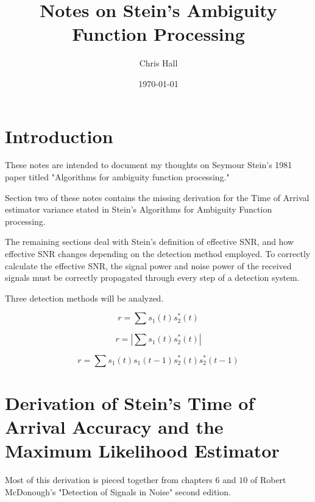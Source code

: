 \documentclass[11pt]{article}
\title{ Notes on Stein's Ambiguity Function Processing}
\author{ Chris Hall }
\date{\today}
\begin{document}
\maketitle  





\section{Introduction}

These notes are intended to document my thoughts on Seymour Stein's 1981 paper titled "Algorithms for ambiguity function processing."

Section two of these notes contains the missing derivation for the Time of Arrival estimator variance stated in Stein's Algorithms for Ambiguity Function processing.

The remaining sections deal with Stein's definition of effective SNR, and how effective SNR changes depending on the detection method employed.
To correctly calculate the effective SNR, the signal power and noise power of the received signals must be correctly propagated through every step of a detection system.

Three detection methods will be analyzed.

\begin{equation}
r = \sum s_1(t) s_2^*(t)
\end{equation}

\begin{equation}
r = |\sum s_1(t) s_2^*(t)|
\end{equation}

\begin{equation}
r = \sum s_1(t)s_1(t-1) s_2^*(t) s_2^*(t-1)
\end{equation}


\section{Derivation of Stein's Time of Arrival Accuracy and the Maximum Likelihood Estimator}

Most of this derivation is pieced together from chapters $6$ and $10$ of Robert McDonough's "Detection of Signals in Noise" second edition.
\end{document}
